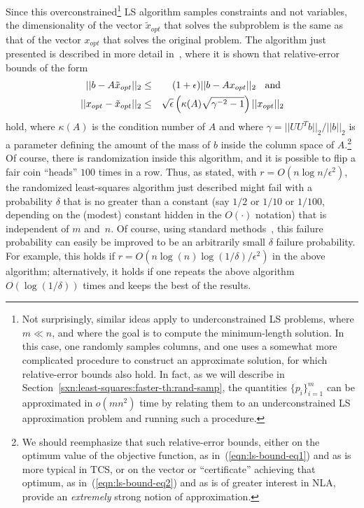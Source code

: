 \documentclass[twoside]{article}
\begin{document}
Since this overconstrained\footnote{Not surprisingly, similar ideas apply to underconstrained LS 
problems, where $m \ll n$, and where the goal is to compute the 
minimum-length solution.  In this case, one randomly samples columns, and 
one uses a somewhat more complicated procedure to construct an approximate 
solution, for which relative-error bounds also hold.  In fact, as we will 
describe in Section~\ref{sxn:least-squares:faster-th:rand-samp},
the quantities $\{p_i\}_{i=1}^{m}$ can be approximated in $o(mn^2)$ 
time by relating them to an underconstrained LS approximation problem and 
running such a procedure.}
LS algorithm samples constraints and not variables, the 
dimensionality of the vector $\tilde{x}_{opt}$ that solves the subproblem is 
the same as that of the vector $x_{opt}$ that solves the original problem.
The algorithm just presented is described in more detail 
in~\cite{DMM06,DMM08_CURtheory_JRNL,DMMS07_FastL2_NM10},
where it is shown that relative-error bounds of the form 
\begin{eqnarray}
\label{eqn:ls-bound-eq1}
||b-A\tilde{x}_{opt}||_2 
   &\leq& (1+\epsilon) ||b-Ax_{opt}||_2  \hspace{2mm} \mbox{ and } \\
\label{eqn:ls-bound-eq2}
||x_{opt} - \tilde{x}_{opt}||_2
   &\leq& \sqrt{\epsilon} \left( \kappa(A)\sqrt{\gamma^{-2}-1} \right) ||x_{opt}||_2  
\end{eqnarray}
hold, where $\kappa(A)$ is the condition number of $A$ and where 
$\gamma = ||UU^Tb||_2/||b||_2$ is a parameter defining the amount of the 
mass of $b$ inside the column space of $A$.\footnote{We should reemphasize that such relative-error bounds, either on the 
optimum value of the objective function, as in~(\ref{eqn:ls-bound-eq1}) and 
as is more typical in TCS, or on the vector or ``certificate'' achieving 
that optimum, as in~(\ref{eqn:ls-bound-eq2}) and as is of greater interest 
in NLA, provide an \emph{extremely} strong notion of approximation.}
Of course, there is randomization inside this algorithm, and it is possible
to flip a fair coin ``heads'' $100$ times in a row.
Thus, as stated, with $r=O(n \log n/\epsilon^2)$, the randomized 
least-squares algorithm just described might fail with a probability 
$\delta$ that is no greater than a constant (say $1/2$ or $1/10$ or $1/100$, 
depending on the (modest) constant hidden in the $O(\cdot)$ notation) that 
is independent of $m$ and~$n$.
Of course, using standard methods~\cite{MotwaniRaghavan95}, this failure 
probability can easily be improved to be an arbitrarily small $\delta$ 
failure probability.
For example, this holds if $r = O(n \log(n)\log(1/\delta)/\epsilon^2)$ in the above 
algorithm;
alternatively, it holds if one repeats the above algorithm $O(\log(1/\delta))$ times 
and keeps the best of the results. 
\end{document}
